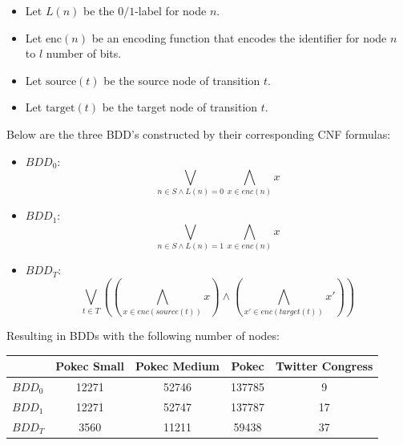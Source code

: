             \begin{itemize}
                \item Let $L(n)$ be the $0/1$-label for node $n$.
                \item Let $\text{enc}(n)$ be an encoding function that encodes
                    the identifier for node $n$ to $l$ number of bits.
                \item Let $\text{source}(t)$ be the source node of transition
                    $t$.
                \item Let $\text{target}(t)$ be the target node of transition
                    $t$.
            \end{itemize}

            Below are the three BDD's constructed by their corresponding CNF
            formulas:

            \begin{itemize}
                \item $BDD_0 :$
                \[
                    \bigvee_{n \in S \land L(n) = 0} \bigwedge_{x \in enc(n)}x
                \]
                \item $BDD_1 :$
                \[
                    \bigvee_{n \in S \land L(n) = 1} \bigwedge_{x \in enc(n)}x
                \]
                \item $BDD_T :$
                \[
                    \bigvee_{t \in T}( (\bigwedge_{x \in enc(source(t))}x )
                    \land(\bigwedge_{x' \in enc(target(t))}x'))
                \]
            \end{itemize}

            Resulting in BDDs with the following number of nodes:

            \begin{table}[h]
                \centering
                \begin{tabular}{l c c c c}
                    \toprule
                    & Pokec Small & Pokec Medium & Pokec & Twitter Congress \\
                    \midrule
                    $BDD_0$ & 12271 & 52746 & 137785 & 9 \\
                    $BDD_1$ & 12271 & 52747 & 137787 & 17 \\
                    $BDD_T$ & 3560 & 11211 & 59438 & 37 \\
                    \bottomrule
                \end{tabular}
            \end{table}

